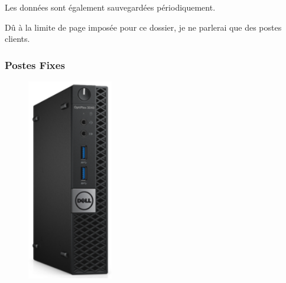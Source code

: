 \documentclass[11pt,a4paper,oneside]{article}
\begin{document}
Les données sont également sauvegardées périodiquement.
    
Dû à la limite de page imposée pour ce dossier, je ne parlerai que des postes clients.
\newpage

\subsubsection{Postes Fixes}
\begin{figure}
\includegraphics[scale=0.4]{Ressources/Materiel/3040.png}\vspace{-2cm}
\end{figure}
\end{document}
